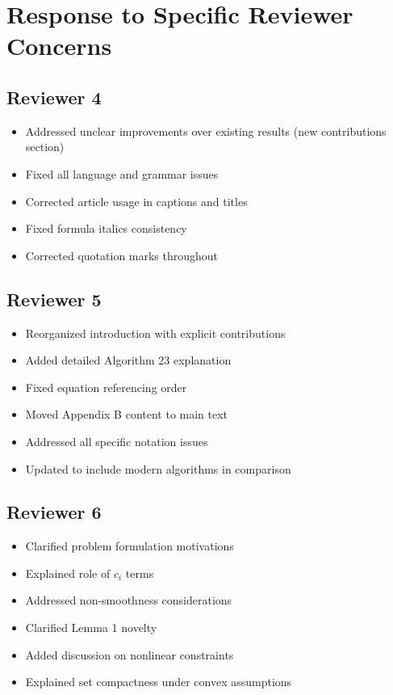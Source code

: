 \documentclass[11pt]{article}
\begin{document}
\section{Response to Specific Reviewer Concerns}

\subsection{Reviewer 4}
\begin{itemize}
\item Addressed unclear improvements over existing results (new contributions section)
\item Fixed all language and grammar issues
\item Corrected article usage in captions and titles
\item Fixed formula italics consistency
\item Corrected quotation marks throughout
\end{itemize}

\subsection{Reviewer 5}
\begin{itemize}
\item Reorganized introduction with explicit contributions
\item Added detailed Algorithm 23 explanation
\item Fixed equation referencing order
\item Moved Appendix B content to main text
\item Addressed all specific notation issues
\item Updated to include modern algorithms in comparison
\end{itemize}

\subsection{Reviewer 6}
\begin{itemize}
\item Clarified problem formulation motivations
\item Explained role of $c_i$ terms
\item Addressed non-smoothness considerations
\item Clarified Lemma 1 novelty
\item Added discussion on nonlinear constraints
\item Explained set compactness under convex assumptions
\end{itemize}
\end{document}
